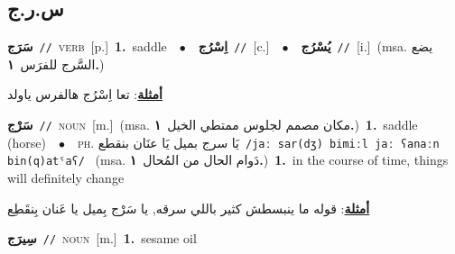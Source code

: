 \documentclass[10pt,a4paper,twoside]{article} %
\begin{document}
\begin{multicols}{2}
\vspace{-3mm}
\subsection*{\color{blue}\foreignlanguage{arabic}{س.ر.ج}\color{blue}{}} 

{\setlength\topsep{0pt}\textbf{\foreignlanguage{arabic}{سَرَج}}\ {\color{gray}\texttt{//}\color{black}}\ \textsc{verb}\ [p.]\ \textbf{1.}~saddle\ \ $\bullet$\ \ \setlength\topsep{0pt}\textbf{\foreignlanguage{arabic}{اِسْرُج}}\ {\color{gray}\texttt{//}\color{black}}\ [c.]\ \ $\bullet$\ \ \setlength\topsep{0pt}\textbf{\foreignlanguage{arabic}{يُسْرُج}}\ {\color{gray}\texttt{//}\color{black}}\ [i.]\ \color{gray}(msa. \foreignlanguage{arabic}{يضع السَّرج للفرَس}~\foreignlanguage{arabic}{\textbf{١.}})\color{black}\  \begin{flushright}\color{gray}\foreignlanguage{arabic}{\textbf{\underline{\foreignlanguage{arabic}{أمثلة}}}: تعا اِسْرُج هالفرس ياولد}\end{flushright}\color{black}} \vspace{2mm}

{\setlength\topsep{0pt}\textbf{\foreignlanguage{arabic}{سَرْج}}\ {\color{gray}\texttt{//}\color{black}}\ \textsc{noun}\ [m.]\ \color{gray}(msa. \foreignlanguage{arabic}{مكان مصمم لجلوس ممتطي الخيل}~\foreignlanguage{arabic}{\textbf{١.}})\color{black}\ \textbf{1.}~saddle (horse)\ \ $\bullet$\ \ \textsc{ph.} \color{gray} \foreignlanguage{arabic}{يَا سرج بميل يَا عنَان بنقطع}\color{black}\ {\color{gray}\texttt{/{\sffamily jaː sar(dʒ) bimiːl jaː ʕanaːn bin(q)atˤaʕ}/}\color{black}}\ \color{gray} (msa. \foreignlanguage{arabic}{دَوام الحال من المُحال}~\foreignlanguage{arabic}{\textbf{١.}})\color{black}\ \textbf{1.}~in the course of time, things will definitely change\  \begin{flushright}\color{gray}\foreignlanguage{arabic}{\textbf{\underline{\foreignlanguage{arabic}{أمثلة}}}: قوله ما ينبسطش كثير باللي سرقه, يا سَرْج بِميل يا عَنان بِنقَطِع}\end{flushright}\color{black}} \vspace{2mm}

{\setlength\topsep{0pt}\textbf{\foreignlanguage{arabic}{سِيرَج}}\ {\color{gray}\texttt{//}\color{black}}\ \textsc{noun}\ [m.]\ \textbf{1.}~sesame oil\ } \vspace{2mm}


\end{multicols}
\end{document}
